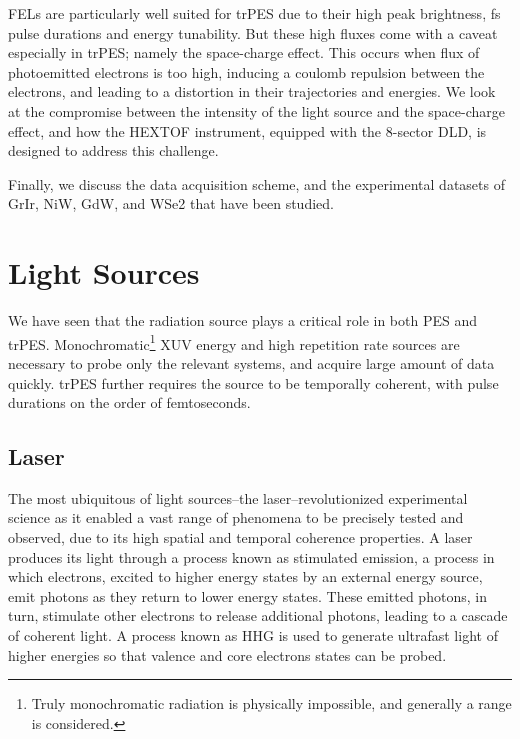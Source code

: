 \Glspl{FEL} are particularly well suited for \gls{trPES} due to their high peak brightness, \unit{fs} pulse durations and energy tunability. But these high fluxes come with a caveat especially in \gls{trPES}; namely the space-charge effect. This occurs when flux of photoemitted electrons is too high, inducing a coulomb repulsion between the electrons, and leading to a distortion in their trajectories and energies. We look at the compromise between the intensity of the light source and the space-charge effect, and how the \gls{HEXTOF} instrument, equipped with the \num{8}-sector \gls{DLD}, is designed to address this challenge.

Finally, we discuss the data acquisition scheme, and the experimental datasets of \gls{GrIr}, \gls{NiW}, \gls{GdW}, and \gls{WSe2} that have been studied.

\section{Light Sources}\label{section:light-sources}
We have seen that the radiation source plays a critical role in both \gls{PES} and \gls{trPES}. Monochromatic\footnote{Truly monochromatic radiation is physically impossible, and generally a range is considered.} \gls{XUV} energy and high repetition rate sources are necessary to probe only the relevant systems, and acquire large amount of data quickly. \Gls{trPES} further requires the source to be temporally coherent, with pulse durations on the order of femtoseconds.

\subsection*{Laser}
The most ubiquitous of light sources--the laser--revolutionized experimental science as it enabled a vast range of phenomena to be precisely tested and observed, due to its high spatial and temporal coherence properties. A laser produces its light through a process known as stimulated emission, a process in which electrons, excited to higher energy states by an external energy source, emit photons as they return to lower energy states. These emitted photons, in turn, stimulate other electrons to release additional photons, leading to a cascade of coherent light. A process known as \gls{HHG} is used to generate ultrafast light of higher energies so that valence and core electrons states can be probed.

